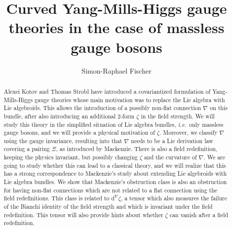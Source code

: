 \documentclass[preprint]{elsarticle}
\theoremstyle{plain}
\theoremstyle{remark}
\theoremstyle{definition}
\begin{document}
\begin{frontmatter}

\title{Curved Yang-Mills-Higgs gauge theories in the case of massless gauge bosons}

\author[mymainaddress,mysecondaryaddress]{Simon-Raphael Fischer}



\address[mymainaddress]{Villa Battelle, Université de Genève, Route de Drize 7, 1227 Carouge, Switzerland}
\address[mysecondaryaddress]{Institut Camille Jordan, Université Claude Bernard Lyon 1, 43 boulevard du 11 novembre 1918, 69622 Villeurbanne cedex, France}

\begin{abstract}
Alexei Kotov and Thomas Strobl have introduced a covariantized formulation of Yang-Mills-Higgs gauge theories whose main motivation was to replace the Lie algebra with Lie algebroids. This allows the introduction of a possibly non-flat connection $\nabla$ on this bundle, after also introducing an additional 2-form $\zeta$ in the field strength. We will study this theory in the simplified situation of Lie algebra bundles, \textit{i.e.}~only massless gauge bosons, and we will provide a physical motivation of $\zeta$. Moreover, we classify $\nabla$ using the gauge invariance, resulting into that $\nabla$ needs to be a Lie derivation law covering a pairing $\Xi$, as introduced by Mackenzie. There is also a field redefinition, keeping the physics invariant, but possibly changing $\zeta$ and the curvature of $\nabla$. We are going to study whether this can lead to a classical theory, and we will realize that this has a strong correspondence to Mackenzie's study about extending Lie algebroids with Lie algebra bundles. We show that Mackenzie's obstruction class is also an obstruction for having non-flat connections which are not related to a flat connection using the field redefinitions. This class is related to $\mathrm{d}^\nabla \zeta$, a tensor which also measures the failure of the Bianchi identity of the field strength and which is invariant under the field redefinition. This tensor will also provide hints about whether $\zeta$ can vanish after a field redefinition.
\end{abstract}


\end{frontmatter}
\end{document}

